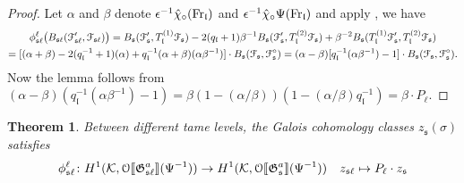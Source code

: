 \documentclass[leqno]{amsart}
\newtheorem{thm}{Theorem}[section]
\theoremstyle{definition}
\theoremstyle{remark}
\newcommand{\eo}{\EuScript{O}}
\newcommand{\Fr}{\textnormal{Fr}} %
\newcommand{\fl}{\mathfrak{l}}
\newcommand{\fs}{\mathfrak{s}}
\newcommand{\K}{{\mathcal{K}}} %
\newcommand{\fG}{\mathfrak{G}}
\newcommand{\euF}{\EuScript{F}} %
\begin{document}
\begin{proof}
Let $\alpha$ and  $\beta$ denote 
$\epsilon^{-1}\hat{\chi}_\circ(\Fr_\fl)$ and 
$\epsilon^{-1}\hat{\chi}_\circ\Psi(\Fr_\fl)$
and apply \cite{lee}, we have
\begin{multline*}
\phi_{\fs\ell}^\ell
\big(B_{\fs\ell}(\euF'_{\fs\ell}, \euF_{\fs\ell})\big)=
B_\fs(\euF'_\fs, T_\fl^{(1)}\euF_\fs)
-2(q_\fl+1)\beta^{-1}B_\fs(\euF'_\fs, T_\fl^{(2)}\euF_\fs)
+\beta^{-2}B_\fs(T_\fl^{(1)}\euF'_\fs, T_\fl^{(2)}\euF_\fs)
\\=
[(\alpha+\beta)-2(q_\fl^{-1}+1)(\alpha)
+q_\fl^{-1}(\alpha+\beta)(\alpha\beta^{-1})]\cdot 
B_\fs(\euF_{\fs}, \euF^\circ_\fs)=
(\alpha-\beta)[q_\fl^{-1}(\alpha\beta^{-1})-1]\cdot 
B_\fs(\euF_{\fs}, \euF^\circ_\fs).
\end{multline*}
Now the lemma follows from
$(\alpha-\beta)(q_\fl^{-1}(\alpha\beta^{-1})-1)
=\beta(1-(\alpha/\beta))(1-(\alpha/\beta)q_\fl^{-1})
=\beta\cdot P_\ell$.
\end{proof}



\begin{thm}\label{thm:eu2}
    Between different tame levels,
    the Galois cohomology classes $z_\fs(\sigma)$ satisfies
	\[
		\phi_{\fs\ell}^{\ell}\colon
		H^1(\K,\eo\llbracket\fG_{\fs\ell}^a\rrbracket(\Psi^{-1}))\to 
		H^1(\K,\eo\llbracket\fG_\fs^a\rrbracket(\Psi^{-1}))\quad
		z_{\fs\ell}\mapsto
		P_\ell\cdot z_\fs
	\]
\end{thm}
\end{document}
